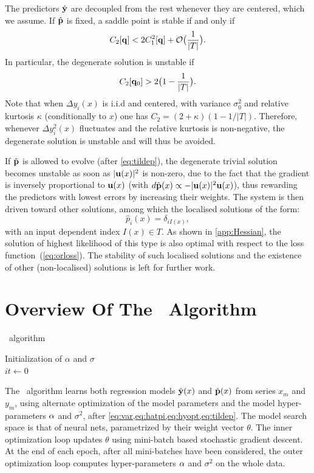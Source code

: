 %
The predictors $\hat {\bf y}$ are decoupled from the rest whenever they are centered, which we 
assume. If $\hat {\bf p}$ is fixed, a saddle point is stable if and only if
%
\[
  C_2[{\bf q}] < 2C_1^2[{\bf q}]+{\cal O}\bigl(\frac{1}{\vert T\vert}\bigr).
\]
%
In particular, the degenerate solution is unstable if
%
\[
  C_2[{\bf q}_0] > 2\bigl(1-\frac{1}{\vert T\vert}\bigr).
\]
%
Note that when $\Delta y_i(x)$ is i.i.d and centered, with variance $\sigma_0^2$ and relative 
kurtosis $\kappa$ (conditionally to $x$) one has $C_2 = (2+\kappa)(1-1/\vert T\vert)$. Therefore, 
whenever $\Delta y_i^2(x)$ fluctuates and the relative kurtosis is non-negative,
the degenerate solution is unstable and will thus be avoided.

If $\hat {\bf p}$ is allowed to evolve (after \cref{eq:tildep}), the degenerate trivial 
solution becomes unstable as soon as $\vert {\bf u}(x)\vert^2$ is non-zero, due to the fact that 
the gradient is inversely proportional to ${\bf u}(x)$ (with 
$d\hat{\bf p}(x)\propto -\vert {\bf u}(x)\vert^2 {\bf u}(x)$), thus rewarding the predictors with lowest 
errors by increasing their weights. The system is then driven toward other solutions, among which 
the localised solutions of the form:
% 
\[
  \hat p_i(x) = \delta_{iI(x)},
\]
%
with an input dependent index $I(x)\in T$. As shown in \cref{app:Hessian}, the solution of highest 
likelihood of this type is also optimal with respect to the loss function~(\cref{eq:orloss}). The 
stability of such localised solutions and the existence of other (non-localised) solutions is left 
for further work.  


\section{Overview Of The \XX\ Algorithm}\label{sec:model}
\begin{algorithm}[H]
  \SetAlgoLined
   \caption{\XX\ algorithm}
   Initialization of $\alpha$ and $\sigma$\\
   $it \longleftarrow 0$ \;
\end{algorithm}
The \XX\ algorithm learns both regression models $\hat {\bf y}(x)$ and $\hat {\bf p}(x)$ from 
series $x_m$ and $y_m$, using alternate optimization of the model parameters and the model 
hyper-parameters ${\bf \alpha}$ and $\sigma^2$, after \cref{eq:var,eq:hatpi,eq:hyopt,eq:tildep}. 
The model search space is that of neural nets, parametrized by their weight vector $\theta$. 
The inner optimization loop updates $\theta$ using mini-batch based stochastic gradient descent. 
At the end of each epoch, after all mini-batches have been considered, the outer optimization loop 
computes hyper-parameters ${\bf \alpha}$ and $\sigma^2$ on the whole data. 
 
